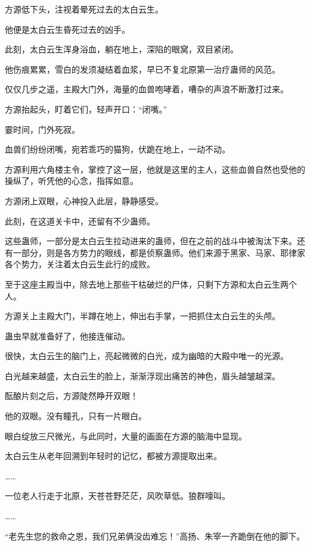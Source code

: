 
\begin{this_body}

方源低下头，注视着晕死过去的太白云生。

他便是太白云生昏死过去的凶手。

此刻，太白云生浑身浴血，躺在地上，深陷的眼窝，双目紧闭。

他伤痕累累，雪白的发须凝结着血浆，早已不复北原第一治疗蛊师的风范。

仅仅几步之遥，主殿大门外，海量的血兽咆哮着，嘈杂的声浪不断激打过来。

方源抬起头，盯着它们，轻声开口：“闭嘴。”

霎时间，门外死寂。

血兽们纷纷闭嘴，宛若乖巧的猫狗，伏跪在地上，一动不动。

方源利用六角楼主令，掌控了这一层，他就是这里的主人，这些血兽自然也受他的操纵了，听凭他的心念，指挥如意。

方源闭上双眼，心神投入此层，静静感受。

此刻，在这道关卡中，还留有不少蛊师。

这些蛊师，一部分是太白云生拉动进来的蛊师，但在之前的战斗中被淘汰下来。还有一部分，则是各方势力的眼线，都是侦察蛊师。他们来源于黑家、马家、耶律家各个势力，关注着太白云生此行的成败。

至于这座主殿当中，除去地上那些干枯破烂的尸体，只剩下方源和太白云生两个人。

方源关上主殿大门，半蹲在地上，伸出右手掌，一把抓住太白云生的头颅。

蛊虫早就准备好了，他接连催动。

很快，太白云生的脑门上，亮起微微的白光，成为幽暗的大殿中唯一的光源。

白光越来越盛，太白云生的脸上，渐渐浮现出痛苦的神色，眉头越皱越深。

酝酿片刻之后，方源陡然睁开双眼！

他的双眼。没有瞳孔，只有一片眼白。

眼白绽放三尺微光，与此同时，大量的画面在方源的脑海中显现。

太白云生从老年回溯到年轻时的记忆，都被方源提取出来。

……

一位老人行走于北原，天苍苍野茫茫，风吹草低。狼群嚎叫。

……

“老先生您的救命之恩，我们兄弟俩没齿难忘！”高扬、朱宰一齐跪倒在他的脚下。


\end{this_body}
